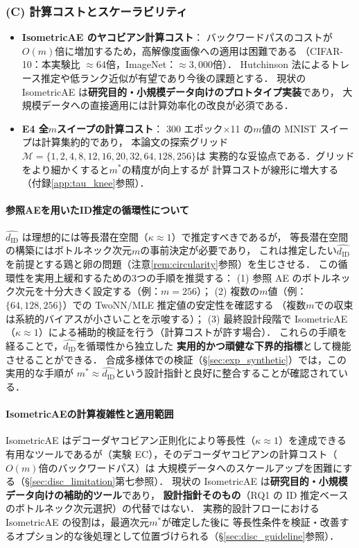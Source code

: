 \documentclass[12pt,a4paper]{jsarticle}
\newcommand{\dID}{d_{\mathrm{ID}}}
\newcommand{\dzopt}{m^*}                    %
\newcommand{\kap}{\kappa}
\begin{document}
\subsubsection*{(C) 計算コストとスケーラビリティ}

\begin{itemize}
  \item \textbf{IsometricAE のヤコビアン計算コスト}：
        バックワードパスのコストが$O(m)$倍に増加するため，高解像度画像への適用は困難である
        （CIFAR-10：本実験比 $\approx 64$倍，ImageNet：$\approx 3{,}000$倍）．
        Hutchinson 法によるトレース推定や低ランク近似\cite{nazari2023geometric}が有望であり今後の課題とする．
        現状の IsometricAE は\textbf{研究目的・小規模データ向けのプロトタイプ実装}であり，
        大規模データへの直接適用には計算効率化の改良が必須である．
  \item \textbf{E4 全$m$スイープの計算コスト}：
        300 エポック$\times$11 の$m$値の MNIST スイープは計算集約的であり，
        本論文の探索グリッド$\mathcal{M} = \{1,2,4,8,12,16,20,32,64,128,256\}$は
        実務的な妥協点である．グリッドをより細かくすると$\dzopt$の精度が向上するが
        計算コストが線形に増大する（付録\ref{app:tau_knee}参照）．
\end{itemize}

\paragraph{参照AEを用いたID推定の循環性について}
$\hat{\dID}$ は理想的には等長潜在空間（$\kap \approx 1$）で推定すべきであるが，
等長潜在空間の構築にはボトルネック次元$m$の事前決定が必要であり，
これは推定したい$\hat{\dID}$を前提とする鶏と卵の問題（注意\ref{rem:circularity}参照）を生じさせる．
この循環性を実用上緩和するための3つの手順を推奨する：
(1) 参照 AE のボトルネック次元を十分大きく設定する（例：$m = 256$）；
(2) 複数の$m$値（例：$\{64, 128, 256\}$）での TwoNN/MLE 推定値の安定性を確認する
（複数$m$での収束は系統的バイアスが小さいことを示唆する）；
(3) 最終設計段階で IsometricAE（$\kap \approx 1$）による補助的検証を行う（計算コストが許す場合）．
これらの手順を経ることで，$\hat{\dID}$を循環性から独立した
\textbf{実用的かつ頑健な下界的指標}として機能させることができる．
合成多様体での検証（§\ref{sec:exp_synthetic}）では，この実用的な手順が
$\dzopt \approx \hat{\dID}$という設計指針と良好に整合することが確認されている．

\paragraph{IsometricAEの計算複雑性と適用範囲}
IsometricAE はデコーダヤコビアン正則化により等長性（$\kap \approx 1$）を達成できる
有用なツールであるが（実験 EC），そのデコーダヤコビアンの計算コスト（$O(m)$倍のバックワードパス）は
大規模データへのスケールアップを困難にする（§\ref{sec:disc_limitation}第七参照）．
現状の IsometricAE は\textbf{研究目的・小規模データ向けの補助的ツール}であり，
\textbf{設計指針そのもの}（RQ1 の ID 推定ベースのボトルネック次元選択）の代替ではない．
実務的設計フローにおける IsometricAE の役割は，最適次元$\dzopt$が確定した後に
等長性条件を検証・改善するオプション的な後処理として位置づけられる（§\ref{sec:disc_guideline}参照）．
\end{document}

